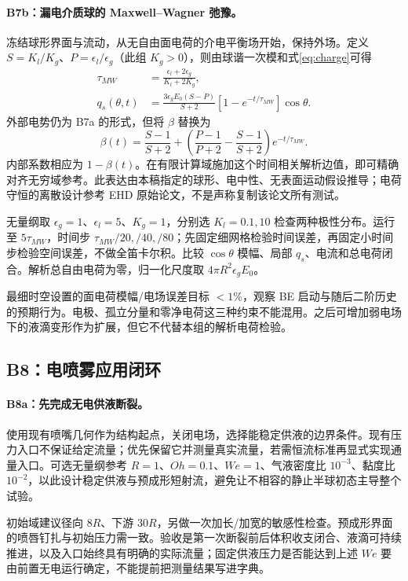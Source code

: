 \documentclass[11pt,a4paper]{article}
\begin{document}
\paragraph{B7b：漏电介质球的 Maxwell--Wagner 弛豫。}
冻结球形界面与流动，从无自由面电荷的介电平衡场开始，保持外场。定义 $S=K_l/K_g$、$P=\epsilon_l/\epsilon_g$（此组 $K_g>0$），则由球谐一次模和式\eqref{eq:charge}可得
\begin{align}
\tau_{MW}&=\frac{\epsilon_l+2\epsilon_g}{K_l+2K_g},\\
q_s(\theta,t)&=\frac{3\epsilon_g E_0(S-P)}{S+2}
\left[1-e^{-t/\tau_{MW}}\right]\cos\theta.
\end{align}
外部电势仍为 B7a 的形式，但将 $\beta$ 替换为
\begin{equation}
\beta(t)=\frac{S-1}{S+2}+
\left(\frac{P-1}{P+2}-\frac{S-1}{S+2}\right)e^{-t/\tau_{MW}}.
\end{equation}
内部系数相应为 $1-\beta(t)$。在有限计算域施加这个时间相关解析边值，即可精确对齐无穷域参考。此表达由本稿指定的球形、电中性、无表面运动假设推导；电荷守恒的离散设计参考 EHD 原始论文\cite{lopez2011}，不是声称复制该论文所有测试。

无量纲取 $\epsilon_g=1$、$\epsilon_l=5$、$K_g=1$，分别选 $K_l=0.1,10$ 检查两种极性分布。运行至 $5\tau_{MW}$，时间步 $\tau_{MW}/20,/40,/80$；先固定细网格检验时间误差，再固定小时间步检验空间误差，不做全笛卡尔积。比较 $\cos\theta$ 模幅、局部 $q_s$、电流和总电荷闭合。解析总自由电荷为零，归一化尺度取 $4\pi R^2\epsilon_g E_0$。

最细时空设置的面电荷模幅/电场误差目标 $<1\%$，观察 BE 启动与随后二阶历史的预期行为。电极、孤立分量和零净电荷这三种约束不能混用。之后可增加弱电场下的液滴变形作为扩展，但它不代替本组的解析电荷检验。

\subsection{B8：电喷雾应用闭环}
\paragraph{B8a：先完成无电供液断裂。}
使用现有喷嘴几何作为结构起点，关闭电场，选择能稳定供液的边界条件。现有压力入口不保证给定流量；优先保留它并测量真实流量，若需恒流标准再显式实现通量入口。可选无量纲参考 $R=1$、$Oh=0.1$、$We=1$、气液密度比 $10^{-3}$、黏度比 $10^{-2}$，以此设计稳定供液与预成形短射流，避免让不相容的静止半球初态主导整个试验。

初始域建议径向 $8R$、下游 $30R$，另做一次加长/加宽的敏感性检查。预成形界面的喷唇钉扎与初始压力需一致。验收是第一次断裂前后体积收支闭合、液滴可持续推进，以及入口始终具有明确的实际流量；固定供液压力是否能达到上述 $We$ 要由前置无电运行确定，不能提前把测量结果写进字典。
\end{document}
